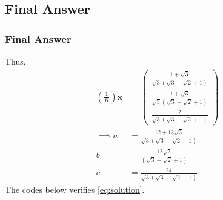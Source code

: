 \documentclass{beamer}
\providecommand{\brak}[1]{\ensuremath{\left(#1\right)}}
\theoremstyle{remark}
\newcommand{\myvec}[1]{\ensuremath{\begin{pmatrix}#1\end{pmatrix}}}
\let\vec\mathbf
\numberwithin{equation}{section}
\begin{document}
\subsection{Final Answer}
\begin{frame}[fragile]
\frametitle{Final Answer}

Thus, 
\begin{align}
\label{eq:solution}
\brak{\frac{1}{K}}\vec{x}&=\myvec{\frac{1+\sqrt{3}}{\sqrt{3}\brak{\sqrt{3}+\sqrt{2}+1}}\\\frac{1+\sqrt{3}}{\sqrt{3}\brak{\sqrt{3}+\sqrt{2}+1}}\\\frac{2}{\sqrt{3}\brak{\sqrt{3}+\sqrt{2}+1}}}
\\
\implies a&=\frac{12+12\sqrt{3}}{\sqrt{3}\brak{\sqrt{3}+\sqrt{2}+1}}\\
b&=\frac{12\sqrt{2}}{\brak{\sqrt{3}+\sqrt{2}+1}}\\
c&=\frac{24}{\sqrt{3}\brak{\sqrt{3}+\sqrt{2}+1}}
\end{align}
%
The codes below verifies \eqref{eq:solution}.
\end{frame}
\end{document}
